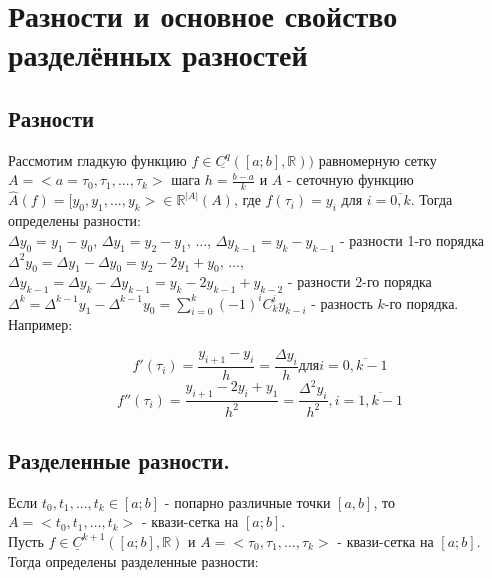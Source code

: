 \documentclass[__main__.tex]{subfiles}
\begin{document}
\section{Разности и основное свойство разделённых разностей}

\subsection{Разности}

Рассмотим гладкую функцию $f \in \underline{C^q}([a;b],\mathbb{R}))$ равномерную сетку $A = <a = \tau_0, \tau_1, \text{...}, \tau_k>$ шага $h = \frac{b-a}{k}$ и $A$ - сеточную функцию $\hat{A}(f) = [y_0, y_1, \text{...}, y_k> \in \mathbb{R}^{|A|}(A)$, где $f(\tau_i) = y_i$ для $i = \overline{0, k}$. Тогда определены разности:\\

$\Delta y_0 = y_1 - y_0$, $\Delta y_1 = y_2 - y_1$, ..., $\Delta y_{k-1} = y_{k} - y_{k-1}$ - разности 1-го порядка\\

$\Delta^2 y_0 = \Delta y_1 - \Delta y_0 = y_2 - 2y_1 + y_0$, ..., $\Delta y_{k-1} = \Delta y_{k} - \Delta y_{k-1} = y_k - 2y_{k-1} + y_{k-2}$ - разности 2-го порядка\\

$\Delta^k = \Delta^{k-1} y_1 - \Delta^{k-1} y_0 = \sum_{i=0}^k (-1)^i C_k^i y_{k-i}$ - разность $k$-го порядка.\\

Например:

$$f'(\tau_i) = \frac{y_{i+1} - y_i}{h} = \frac{\Delta y_i}{h} \text{для} i = \overline{0, k-1}$$
$$f''(\tau_i) = \frac{y_{i+1} - 2y_i + y_1}{h^2} = \frac{\Delta^2 y_i}{h^2}, i = \overline{1, k - 1}$$

\subsection{Разделенные разности.}

Если $t_0, t_1, \text{...}, t_k \in [a; b]$ - попарно различные точки $[a, b]$, то $A = <t_0, t_1, \text{...}, t_k>$ - квази-сетка на $[a; b]$.\\

Пусть $f \in \underline{C}^{k+1}([a; b], \mathbb{R})$ и $A = <\tau_0, \tau_1, \text{...}, \tau_k>$ - квази-сетка на $[a; b]$. Тогда определены разделенные разности:
\end{document}
